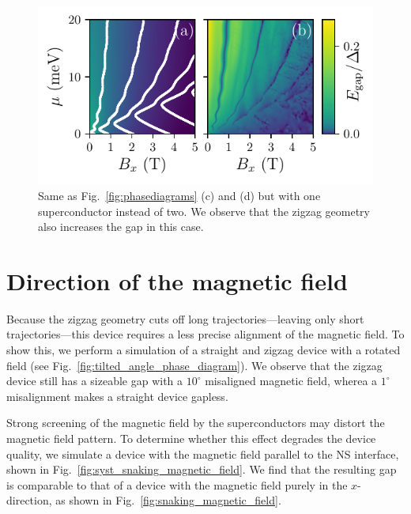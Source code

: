 \documentclass[english, twocolumn, 10pt, aps, superscriptaddress, floatfix, prb, citeautoscript]{revtex4-1}
\renewcommand{\comment}[2]{#2}
\begin{document}
\begin{figure}[!htb]
\centering
\includegraphics[width=0.9\columnwidth]{figures/phasediagrams_NS.pdf}
\caption{Same as Fig.~\ref{fig:phasediagrams} (c) and (d) but with one superconductor instead of two.
We observe that the zigzag geometry also increases the gap in this case.
\label{fig:ns_junction}}
\end{figure}

\section{Direction of the magnetic field}\label{appendix:direction_B}

\comment{Zigzag geometry removes the need for precise field alignment.}
Because the zigzag geometry cuts off long trajectories---leaving only short trajectories---this device requires a less precise alignment of the magnetic field.
To show this, we perform a simulation of a straight and zigzag device with a rotated field (see Fig.~\ref{fig:tilted_angle_phase_diagram}).
We observe that the zigzag device still has a sizeable gap with a $10^\circ$ misaligned magnetic field, wherea a $1^\circ$ misalignment makes a straight device gapless.

\comment{Likewise a inhomogeneous magnetic field does not matter.}
Strong screening of the magnetic field by the superconductors may distort the magnetic field pattern.
To determine whether this effect degrades the device quality, we simulate a device with the magnetic field parallel to the NS interface, shown in Fig.~\ref{fig:syst_snaking_magnetic_field}.
We find that the resulting gap is comparable to that of a device with the magnetic field purely in the $x$-direction, as shown in Fig.~\ref{fig:snaking_magnetic_field}.
\end{document}

